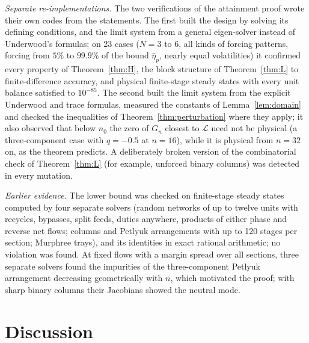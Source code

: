 \documentclass[11pt,a4paper]{report}
\newcommand{\cL}{\mathcal L}
\begin{document}
\emph{Separate re-implementations.} The two verifications of the attainment proof wrote their own codes from the
statements. The first built the design by solving its defining conditions, and the limit system from a general
eigen-solver instead of Underwood's formulas; on 23 cases (\(N=3\) to \(6\), all kinds of forcing patterns, forcing from
\(5\%\) to \(99.9\%\) of the bound \(\hat\eta_p\), nearly equal volatilities) it confirmed every property of
Theorem~\ref{thm:H}, the block structure of Theorem~\ref{thm:L} to finite-difference accuracy, and physical finite-stage
steady states with every unit balance satisfied to \(10^{-85}\). The second built the limit system from the explicit
Underwood and trace formulas, measured the constants of Lemma~\ref{lem:domain} and checked the inequalities of
Theorem~\ref{thm:perturbation} where they apply; it also observed that below \(n_0\) the zero of \(G_n\) closest to \(\cL\) need
not be physical (a three-component case with \(q=-0.5\) at \(n=16\)), while it is physical from \(n=32\) on, as the theorem
predicts. A deliberately broken version of the combinatorial check of Theorem~\ref{thm:L} (for example, unforced binary
columns) was detected in every mutation.

\emph{Earlier evidence.} The lower bound was checked on finite-stage steady states computed by four separate solvers
(random networks of up to twelve units with recycles, bypasses, split feeds, duties anywhere, products of either phase and
reverse net flows; columns and Petlyuk arrangements with up to 120 stages per section; Murphree trays), and its identities
in exact rational arithmetic; no violation was found. At fixed flows with a margin spread over all sections, three
separate solvers found the impurities of the three-component Petlyuk arrangement decreasing geometrically with \(n\),
which motivated the proof; with sharp binary columns their Jacobians showed the neutral mode.

\section{Discussion}\label{sec:discussion}
\end{document}
